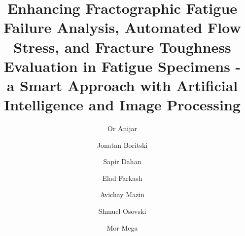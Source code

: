 \documentclass[preprint,12pt]{elsarticle}
\begin{document}
\begin{frontmatter}



\title{Enhancing Fractographic Fatigue Failure Analysis, Automated Flow Stress, and Fracture Toughness Evaluation in Fatigue Specimens - a Smart Approach with Artificial Intelligence and Image Processing}

\author[Computer_b]{Or Anijar}
\author[Computer_a]{Jonatan Boritski}
\author[Computer_a]{Sapir Dahan}
\author[soreq]{Elad Farkash}
\author[Computer_a]{Avichay Mazin}
\author[technion]{Shmuel Osovski}
\author[fracture]{Mor Mega}




\end{frontmatter}
\end{document}
